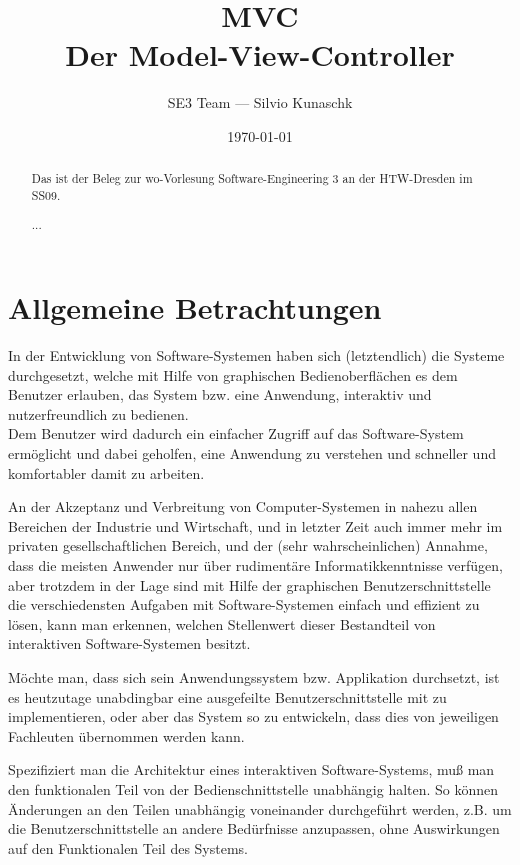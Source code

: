 \documentclass[11pt,a4paper,titlepage]{scrreprt}
\begin{document}
\selectlanguage{\german}

\title{{\Huge \bf MVC}\\[0.55em]{\LARGE Der Model-View-Controller}}
\author{SE3 Team --- Silvio Kunaschk}

\date{\today}
\maketitle

\begin{abstract}
Das ist der Beleg zur wo-Vorlesung Software-Engineering 3 an der HTW-Dresden im SS09.

...

\end{abstract}

\tableofcontents

\chapter{Allgemeine Betrachtungen}
In der Entwicklung von Software-Systemen haben sich (letztendlich) die Systeme durchgesetzt, 
welche mit Hilfe von graphischen Bedienoberflächen es dem Benutzer erlauben, das System
bzw. eine Anwendung, interaktiv und nutzerfreundlich zu bedienen.\\
Dem Benutzer wird dadurch ein einfacher Zugriff auf das Software-System ermöglicht und
dabei geholfen, eine Anwendung zu verstehen und schneller und komfortabler damit zu arbeiten.

An der Akzeptanz und Verbreitung von Computer-Systemen in nahezu allen Bereichen der Industrie
und Wirtschaft, und in letzter Zeit auch immer mehr im privaten gesellschaftlichen Bereich, und
der (sehr wahrscheinlichen) Annahme, dass die meisten Anwender nur über rudimentäre
Informatikkenntnisse verfügen, aber trotzdem in der Lage sind mit Hilfe der graphischen
Benutzerschnittstelle die verschiedensten Aufgaben mit Software-Systemen einfach und effizient
zu lösen, kann man erkennen, welchen Stellenwert dieser Bestandteil von interaktiven
Software-Systemen besitzt.

Möchte man, dass sich sein Anwendungssystem bzw. Applikation durchsetzt, ist es heutzutage
unabdingbar eine ausgefeilte Benutzerschnittstelle mit zu implementieren, oder aber 
das System so zu entwickeln, dass dies von jeweiligen Fachleuten übernommen werden kann.

Spezifiziert man die Architektur eines interaktiven Software-Systems, muß man den funktionalen
Teil von der Bedienschnittstelle unabhängig halten. So können Änderungen an den Teilen
unabhängig voneinander durchgeführt werden, z.B. um die Benutzerschnittstelle an andere
Bedürfnisse anzupassen, ohne Auswirkungen auf den Funktionalen Teil des Systems.
\end{document}
